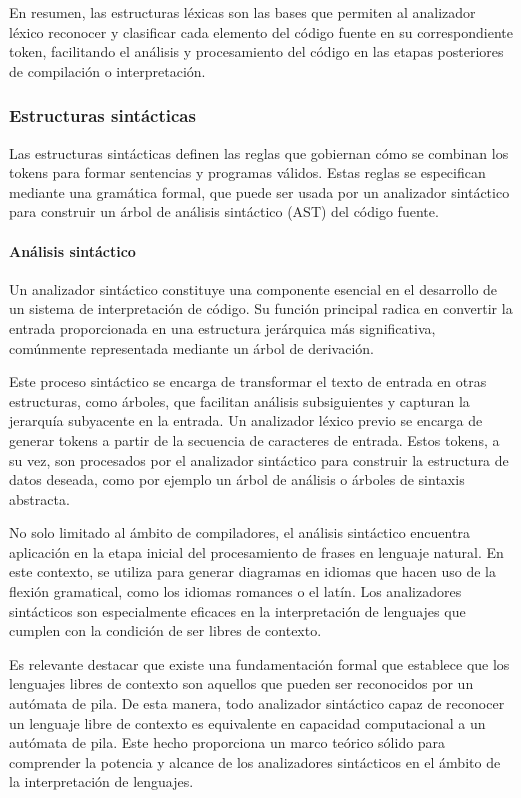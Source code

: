 En resumen, las estructuras léxicas son las bases que permiten al analizador léxico reconocer y clasificar cada elemento del código fuente en su correspondiente token, facilitando el análisis y procesamiento del código en las etapas posteriores de compilación o interpretación.

\subsubsection{Estructuras sintácticas}
Las estructuras sintácticas definen las reglas que gobiernan cómo se combinan los tokens para formar sentencias y programas válidos. Estas reglas se especifican mediante una gramática formal, que puede ser usada por un analizador sintáctico para construir un árbol de análisis sintáctico (AST) del código fuente.

\paragraph{Análisis sintáctico}

Un analizador sintáctico constituye una componente esencial en el desarrollo de un sistema de interpretación de código. Su función principal radica en convertir la entrada proporcionada en una estructura jerárquica más significativa, comúnmente representada mediante un árbol de derivación. \parencite{OrtínSoler2004}

Este proceso sintáctico se encarga de transformar el texto de entrada en otras estructuras, como árboles, que facilitan análisis subsiguientes y capturan la jerarquía subyacente en la entrada. Un analizador léxico previo se encarga de generar tokens a partir de la secuencia de caracteres de entrada. Estos tokens, a su vez, son procesados por el analizador sintáctico para construir la estructura de datos deseada, como por ejemplo un árbol de análisis o árboles de sintaxis abstracta.

No solo limitado al ámbito de compiladores, el análisis sintáctico encuentra aplicación en la etapa inicial del procesamiento de frases en lenguaje natural. En este contexto, se utiliza para generar diagramas en idiomas que hacen uso de la flexión gramatical, como los idiomas romances o el latín. Los analizadores sintácticos son especialmente eficaces en la interpretación de lenguajes que cumplen con la condición de ser libres de contexto. \parencite{OrtínSoler2004}

Es relevante destacar que existe una fundamentación formal que establece que los lenguajes libres de contexto son aquellos que pueden ser reconocidos por un autómata de pila. De esta manera, todo analizador sintáctico capaz de reconocer un lenguaje libre de contexto es equivalente en capacidad computacional a un autómata de pila. Este hecho proporciona un marco teórico sólido para comprender la potencia y alcance de los analizadores sintácticos en el ámbito de la interpretación de lenguajes. \parencite{OrtínSoler2004}

